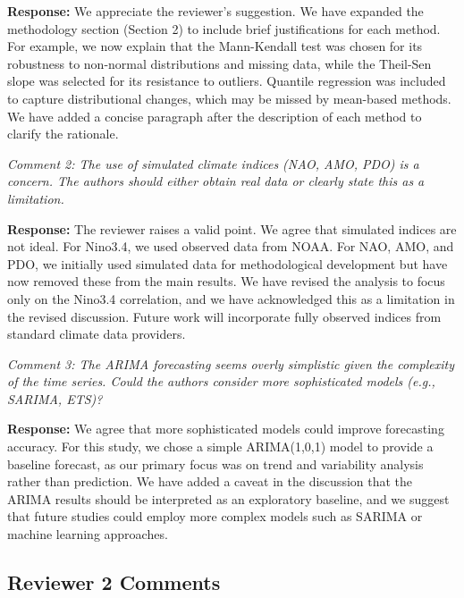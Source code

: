 \documentclass[12pt,a4paper]{article}
\begin{document}
\textbf{Response:} We appreciate the reviewer's suggestion. We have expanded the methodology section (Section 2) to include brief justifications for each method. For example, we now explain that the Mann-Kendall test was chosen for its robustness to non-normal distributions and missing data, while the Theil-Sen slope was selected for its resistance to outliers. Quantile regression was included to capture distributional changes, which may be missed by mean-based methods. We have added a concise paragraph after the description of each method to clarify the rationale.

\vspace{0.5cm}

\textit{Comment 2: The use of simulated climate indices (NAO, AMO, PDO) is a concern. The authors should either obtain real data or clearly state this as a limitation.}

\textbf{Response:} The reviewer raises a valid point. We agree that simulated indices are not ideal. For Nino3.4, we used observed data from NOAA. For NAO, AMO, and PDO, we initially used simulated data for methodological development but have now removed these from the main results. We have revised the analysis to focus only on the Nino3.4 correlation, and we have acknowledged this as a limitation in the revised discussion. Future work will incorporate fully observed indices from standard climate data providers.

\vspace{0.5cm}

\textit{Comment 3: The ARIMA forecasting seems overly simplistic given the complexity of the time series. Could the authors consider more sophisticated models (e.g., SARIMA, ETS)?}

\textbf{Response:} We agree that more sophisticated models could improve forecasting accuracy. For this study, we chose a simple ARIMA(1,0,1) model to provide a baseline forecast, as our primary focus was on trend and variability analysis rather than prediction. We have added a caveat in the discussion that the ARIMA results should be interpreted as an exploratory baseline, and we suggest that future studies could employ more complex models such as SARIMA or machine learning approaches.

\vspace{0.5cm}

\subsection*{Reviewer 2 Comments}
\end{document}
